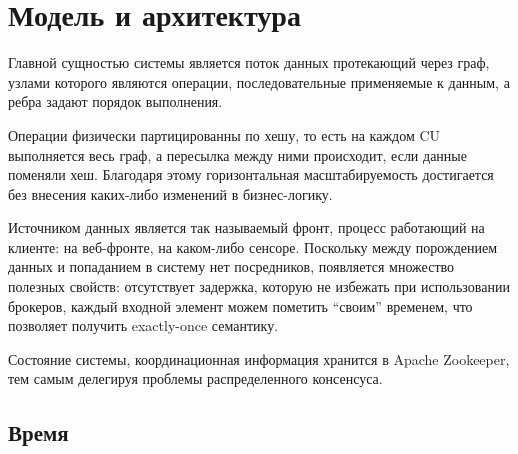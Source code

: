 \documentclass[14pt]{matmex-diploma-custom}
\begin{document}
\maketitle

\tableofcontents

\section{Модель и архитектура}

Главной сущностью системы является поток данных протекающий через граф, узлами которого являются операции, последовательные применяемые к данным, а ребра задают порядок выполнения.

Операции физически партицированны по хешу, то есть на каждом CU выполняется весь граф, а пересылка между ними происходит, если данные поменяли хеш. Благодаря этому горизонтальная масштабируемость достигается без внесения каких-либо изменений в бизнес-логику.

Источником данных является так называемый фронт, процесс работающий на клиенте: на веб-фронте, на каком-либо сенсоре. Поскольку между порождением данных и попаданием в систему нет посредников, появляется множество полезных свойств: отсутствует задержка, которую не избежать при использовании брокеров, каждый входной элемент можем пометить “своим” временем, что позволяет получить exactly-once семантику.

Состояние системы, координационная информация хранится в  Apache Zookeeper, тем самым делегируя проблемы распределенного консенсуса.

\subsection{Время}
\end{document}
